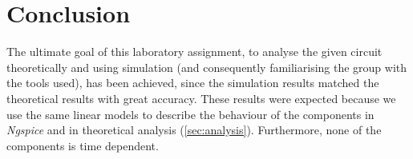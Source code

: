 \section{Conclusion}
\label{sec:conclusion}


The ultimate goal of this laboratory assignment, to analyse 
the given circuit theoretically and using simulation (and consequently
familiarising the group with the tools used), has been achieved, since
the simulation results matched the theoretical results with great accuracy. 
These results were expected because we use the same linear models to 
describe the behaviour of the components in \textit{Ngspice} and in 
theoretical analysis (\ref{sec:analysis}). Furthermore, none of
the components is time dependent.

